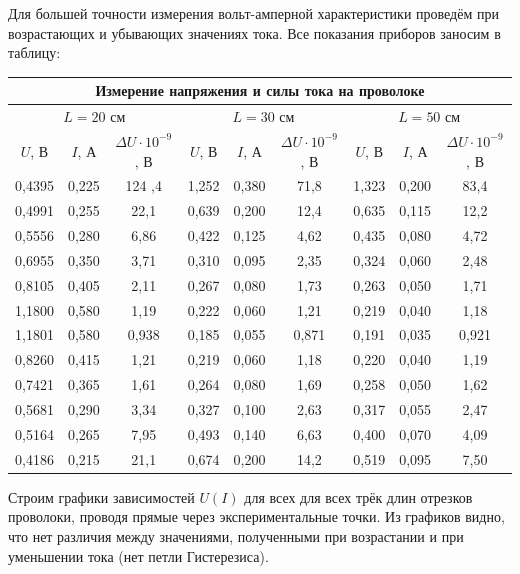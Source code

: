 \documentclass[a4paper, 12pt]{article} %
\begin{document}
Для большей точности измерения вольт-амперной характеристики проведём при возрастающих и убывающих значениях тока. Все показания приборов заносим в таблицу:
\begin{center}
\begin{tabular}{|c|c|c|c|c|c|c|c|c|}
\hline
\multicolumn{9}{|c|}{Измерение напряжения и силы тока на проволоке}                                                                                \\ \hline
\multicolumn{3}{|c|}{$L = 20$ см} & \multicolumn{3}{c|}{$L = 30$ см} & \multicolumn{3}{c|}{$L = 50$ см}                         \\ \hline
$U$, В & $I$, А & $\Delta U \cdot 10^{-9}$, В & $U$, В & $I$, А & $\Delta U \cdot 10^{-9}$, В & $U$, В & $I$, А & $\Delta U \cdot 10^{-9}$, В \\ \hline
0,4395&0,225&124 ,4&1,252&0,380&71,8  &1,323&0,200&83,4  \\ \hline  
0,4991&0,255& 22,1&0,639&0,200&12,4  &0,635&0,115&12,2  \\ \hline
0,5556&0,280& 6,86&0,422&0,125&4,62  &0,435&0,080&4,72  \\ \hline
0,6955&0,350& 3,71&0,310&0,095&2,35  &0,324&0,060&2,48  \\ \hline
0,8105&0,405& 2,11&0,267&0,080&1,73  &0,263&0,050&1,71  \\ \hline
1,1800&0,580& 1,19&0,222&0,060&1,21  &0,219&0,040&1,18  \\ \hline
1,1801&0,580&0,938&0,185&0,055&0,871 &0,191&0,035&0,921  \\ \hline
0,8260&0,415& 1,21&0,219&0,060&1,18  &0,220&0,040&1,19  \\ \hline
0,7421&0,365& 1,61&0,264&0,080&1,69  &0,258&0,050&1,62  \\ \hline
0,5681&0,290& 3,34&0,327&0,100&2,63  &0,317&0,055&2,47  \\ \hline
0,5164&0,265& 7,95&0,493&0,140&6,63  &0,400&0,070&4,09  \\ \hline
0,4186&0,215& 21,1&0,674&0,200&14,2  &0,519&0,095&7,50  \\ \hline
\end{tabular}
\end{center}

Строим графики зависимостей $U(I)$ для всех для всех трёк длин отрезков проволоки, проводя прямые через экспериментальные точки. Из графиков видно, что нет различия между значениями, полученными при возрастании и при уменьшении тока (нет петли Гистерезиса).
\end{document}
